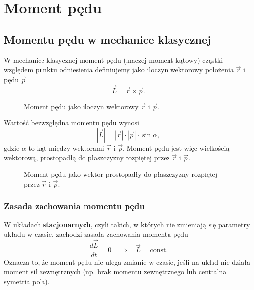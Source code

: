 \section{Moment pędu}

\subsection{Momentu pędu w mechanice klasycznej}
W mechanice klasycznej moment pędu (inaczej moment kątowy) cząstki względem punktu odniesienia definiujemy jako iloczyn wektorowy położenia $\vec{r}$ i pędu $\vec{p}$
$$
\vec{L} = \vec{r} \times \vec{p}.
$$
\begin{figure}[H]
\centering
{}
\caption{Moment pędu jako iloczyn wektorowy $\vec{r}$ i $\vec{p}$.}
\end{figure}

Wartość bezwzględna momentu pędu wynosi
$$
|\vec{L}| = |\vec{r}| \cdot |\vec{p}| \cdot \sin \alpha,
$$
gdzie $\alpha$ to kąt między wektorami $\vec{r}$ i $\vec{p}$. Moment pędu jest więc wielkością wektorową, prostopadłą do płaszczyzny rozpiętej przez $\vec{r}$ i $\vec{p}$.
\begin{figure}[H]
\centering
{}
\caption{Moment pędu jako wektor prostopadły do płaszczyzny rozpiętej przez $\vec{r}$ i $\vec{p}$.}
\end{figure}

\subsubsection*{Zasada zachowania momentu pędu}
W układach \textbf{stacjonarnych}, czyli takich, w których nie zmieniają się parametry układu w czasie, zachodzi zasada zachowania momentu pędu
$$
\frac{d\vec{L}}{dt} = 0 \quad \Rightarrow \quad \vec{L} = \text{const.}
$$
Oznacza to, że moment pędu nie ulega zmianie w czasie, jeśli na układ nie działa moment sił zewnętrznych (np. brak momentu zewnętrznego lub centralna symetria pola).

